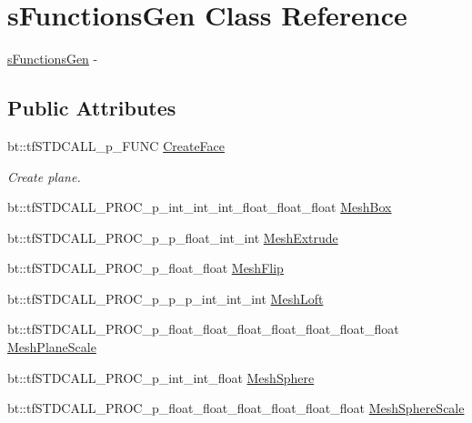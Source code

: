 \hypertarget{structs_functions_gen}{\section{s\-Functions\-Gen Class Reference}
\label{structs_functions_gen}
}


\hyperlink{structs_functions_gen}{s\-Functions\-Gen} -\/  


\subsection*{Public Attributes}
\begin{DoxyCompactItemize}
\item 
bt\-::tf\-S\-T\-D\-C\-A\-L\-L\-\_\-p\-\_\-\-F\-U\-N\-C \hyperlink{structs_functions_gen_a1e8ed08e186afef7c5f7073cea51d189}{Create\-Face}
\begin{DoxyCompactList}\small\item\em Create plane. \end{DoxyCompactList}\item 
bt\-::tf\-S\-T\-D\-C\-A\-L\-L\-\_\-\-P\-R\-O\-C\-\_\-p\-\_\-int\-\_\-int\-\_\-int\-\_\-float\-\_\-float\-\_\-float \hyperlink{structs_functions_gen_a7e62f600fb5ef1c14a628d746ba96dea}{Mesh\-Box}
\item 
bt\-::tf\-S\-T\-D\-C\-A\-L\-L\-\_\-\-P\-R\-O\-C\-\_\-p\-\_\-p\-\_\-float\-\_\-int\-\_\-int \hyperlink{structs_functions_gen_a8697035d58a965494e9ba768c6706cf0}{Mesh\-Extrude}
\item 
bt\-::tf\-S\-T\-D\-C\-A\-L\-L\-\_\-\-P\-R\-O\-C\-\_\-p\-\_\-float\-\_\-float \hyperlink{structs_functions_gen_a74ed4673832a53564483810168901666}{Mesh\-Flip}
\item 
bt\-::tf\-S\-T\-D\-C\-A\-L\-L\-\_\-\-P\-R\-O\-C\-\_\-p\-\_\-p\-\_\-p\-\_\-int\-\_\-int\-\_\-int \hyperlink{structs_functions_gen_a8dd0a201435529ff9b6bafcfb59881f1}{Mesh\-Loft}
\item 
bt\-::tf\-S\-T\-D\-C\-A\-L\-L\-\_\-\-P\-R\-O\-C\-\_\-p\-\_\-float\-\_\-float\-\_\-float\-\_\-float\-\_\-float\-\_\-float\-\_\-float \hyperlink{structs_functions_gen_a537293310fc0985f707403c8790b339b}{Mesh\-Plane\-Scale}
\item 
bt\-::tf\-S\-T\-D\-C\-A\-L\-L\-\_\-\-P\-R\-O\-C\-\_\-p\-\_\-int\-\_\-int\-\_\-float \hyperlink{structs_functions_gen_a9d596ccd0fd766fda3141b7d701a1009}{Mesh\-Sphere}
\item 
bt\-::tf\-S\-T\-D\-C\-A\-L\-L\-\_\-\-P\-R\-O\-C\-\_\-p\-\_\-float\-\_\-float\-\_\-float\-\_\-float\-\_\-float\-\_\-float \hyperlink{structs_functions_gen_aa772d4904e16c83baccd10721e171784}{Mesh\-Sphere\-Scale}

\end{DoxyCompactItemize}
